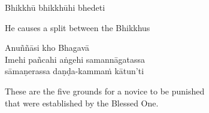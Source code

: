 Bhikkhū bhikkhūhi bhedeti

\begin{cprenglish}
  He causes a split between the Bhikkhus
\end{cprenglish}

Anuññāsi kho Bhagavā\\
Imehi pañcahi aṅgehi samannāgatassa\\
sāmaṇerassa daṇḍa-kammaṁ kātun'ti

\begin{cprenglish}
  These are the five grounds for a novice to be punished\\
  that were established by the Blessed One.
\end{cprenglish}


